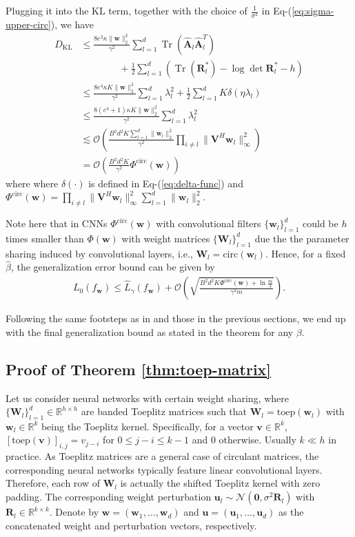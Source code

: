 \documentclass[journal]{IEEEtran} %
\def\eqref#1{Eq-(\ref{#1})}
\newcommand{\nn}{\nonumber}
\def\vu{{\bm{u}}}
\def\vv{{\bm{v}}}
\def\vw{{\bm{w}}}
\def\mA{{\bm{A}}}
\def\mR{{\bm{R}}}
\def\mV{{\bm{V}}}
\def\mW{{\bm{W}}}
\def\gO{{\mathcal{O}}}
\newcommand{\R}{\mathbb{R}}
\newcommand{\KL}{D_{\mathrm{KL}}}
\newcommand{\Norm}[1]{\|#1\|}
\DeclareMathOperator{\Tr}{Tr}
\begin{document}
Plugging it into the KL term, together with the choice of $\frac{1}{\sigma^2}$ in \eqref{eq:sigma-upper-circ}, we have
\begin{align}
    \KL & \le \frac{8e^{2} \kappa\Norm{\vw}_2^2}{\gamma^2} \sum_{l=1}^d \Tr(\hat{\mA}_l \hat{\mA}_l^T) \nn \\
    & \qquad \qquad + \frac{1}{2} \sum_{l=1}^d \left(\Tr(\mR_l^*)  - \log \det \mR_l^* - h \right)\\
    &\le \frac{8 e^4 \kappa K \Norm{\vw}_2^2}{\gamma^2 }   \sum_{l=1}^d \lambda_l^2 + \frac{1}{2}\sum_{l=1}^d K \delta({\eta}{\lambda}_l)\\
    &\le \frac{8 (e^4+1) \kappa K \Norm{\vw}_2^2 }{\gamma^2 } \sum_{l=1}^d \lambda_l^2\\
    &\lesssim \gO\left(  \frac{B^2 d^2 K \sum_{l=1}^d \Norm{\vw_l}_2^2}{\gamma^2} \prod_{i\ne l} \Norm{\mV^H \vw_l}_{\infty}^2\right) \\
    &=\gO\left(\frac{B^2d^2K}{\gamma^2} {\Phi}^{\mathrm{circ}}(\vw)\right)
\end{align}
where where $\delta(\cdot)$ is defined in \eqref{eq:delta-func} and ${\Phi}^{\mathrm{circ}}(\vw)=\prod_{i\ne l} \Norm{\mV^H \vw_l}_{\infty}^2 \sum_{l=1}^d \Norm{\vw_l}_2^2$.


Note here that in CNNs ${\Phi}^{\mathrm{circ}}(\vw)$ with convolutional filters $\{\vw_l\}_{l=1}^d$ could be $h$ times smaller than ${\Phi}(\vw)$ with weight matrices $\{\mW_l\}_{l=1}^d$ due the the parameter sharing induced by convolutional layers, i.e., $\mW_l=\mathrm{circ}(\vw_l)$. 
Hence, for a fixed $\hat{\beta}$, the generalization error bound can be given by
\begin{align}
    L_0(f_{\vw}) \le \hat{L}_{\gamma}(f_{\vw}) + \mathcal{O} \left( \sqrt{ \frac{B^2d^2K {\Phi}^{\mathrm{circ}}(\vw) + \ln \frac{m}{\delta}}{\gamma^2m}} \right).
\end{align}


Following the same footsteps as in \cite{neyshabur2018pac} and those in the previous sections, we end up with the final
generalization bound as stated in the theorem for any $\beta$. 

\subsection{Proof of Theorem \ref{thm:toep-matrix}}
\label{proof:toep-matrix}
Let us consider neural networks with certain weight sharing, where $\{\mW_l\}_{l=1}^d \in \R^{h \times h}$ are banded Toeplitz matrices such that $\mW_l = \mathrm{toep}(\vw_l)$ with $\vw_l \in \R^k$ being the Toeplitz kernel. 
Specifically, for a vector $\vv \in \R^k$, $[\mathrm{toep}(\vv)]_{i,j}=v_{j-i}$ for $0 \le j-i \le k-1$ and 0 otherwise. 
Usually $k \ll h$ in practice. 
As Toeplitz matrices are a general case of circulant matrices, the corresponding neural networks typically feature linear convolutional layers. Therefore, each row of $\mW_l$ is actually the shifted Toeplitz kernel with zero padding. The corresponding weight perturbation $\vu_l \sim \mathcal{N}(\mathbf{0},\sigma^2\mR_l)$ with $\mR_l \in \R^{k \times k}$. Denote by $\vw=(\vw_1,\dots,\vw_d)$ and $\vu=(\vu_1,\dots,\vu_d)$ as the concatenated weight and perturbation vectors, respectively.
\end{document}
